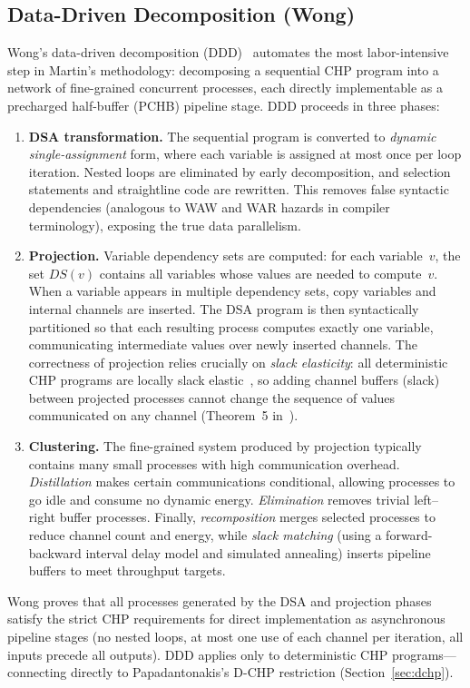 \documentclass[11pt]{article}
\begin{document}
\subsection{Data-Driven Decomposition (Wong)}

Wong's data-driven decomposition (DDD)~\cite{wong2004} automates the
most labor-intensive step in Martin's methodology: decomposing a
sequential CHP program into a network of fine-grained concurrent
processes, each directly implementable as a precharged half-buffer
(PCHB) pipeline stage.  DDD proceeds in three phases:
\begin{enumerate}
\item \textbf{DSA transformation.}  The sequential program is
  converted to \emph{dynamic single-assignment} form, where each
  variable is assigned at most once per loop iteration.  Nested loops
  are eliminated by early decomposition, and selection statements and
  straightline code are rewritten.  This removes false syntactic
  dependencies (analogous to WAW and WAR hazards in compiler
  terminology), exposing the true data parallelism.
\item \textbf{Projection.}  Variable dependency sets are
  computed: for each variable~$v$, the set $\mathit{DS}(v)$ contains
  all variables whose values are needed to compute~$v$.  When a
  variable appears in multiple dependency sets, copy variables and
  internal channels are inserted.  The DSA program is then
  syntactically partitioned so that each resulting process computes
  exactly one variable, communicating intermediate values over newly
  inserted channels.  The correctness of projection relies crucially
  on \emph{slack elasticity}: all deterministic CHP programs are
  locally slack elastic~\cite{manohar2001}, so adding channel buffers
  (slack) between projected processes cannot change the sequence of
  values communicated on any channel (Theorem~5 in~\cite{wong2004}).
\item \textbf{Clustering.}  The fine-grained system produced by
  projection typically contains many small processes with high
  communication overhead.  \emph{Distillation} makes certain
  communications conditional, allowing processes to go idle and
  consume no dynamic energy.  \emph{Elimination} removes
  trivial left--right buffer processes.  Finally,
  \emph{recomposition} merges selected processes to reduce channel
  count and energy, while \emph{slack matching} (using a
  forward-backward interval delay model and simulated annealing)
  inserts pipeline buffers to meet throughput targets.
\end{enumerate}
Wong proves that all processes generated by the DSA and projection
phases satisfy the strict CHP requirements for direct implementation
as asynchronous pipeline stages (no nested loops, at most one use of
each channel per iteration, all inputs precede all outputs).  DDD
applies only to deterministic CHP programs---connecting directly to
Papadantonakis's D-CHP restriction (Section~\ref{sec:dchp}).
\end{document}
